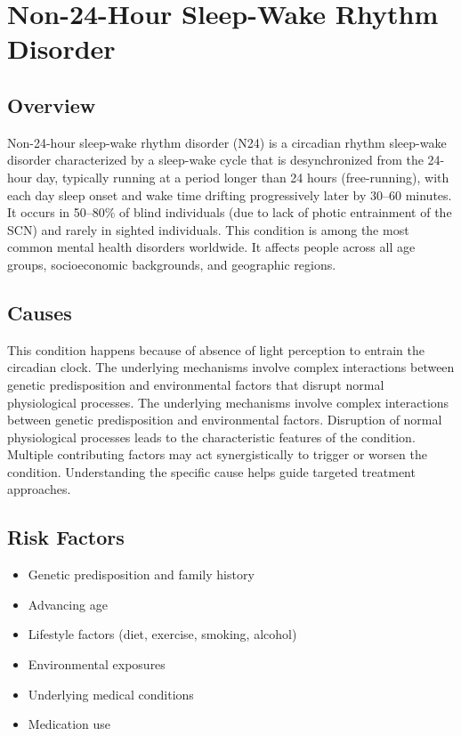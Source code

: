 \chapter{Non-24-Hour Sleep-Wake Rhythm Disorder}
\label{sec:Non-24-Hour Sleep-Wake Rhythm Disorder}

\section{Overview}
Non-24-hour sleep-wake rhythm disorder (N24) is a circadian rhythm sleep-wake disorder characterized by a sleep-wake cycle that is desynchronized from the 24-hour day, typically running at a period longer than 24 hours (free-running), with each day sleep onset and wake time drifting progressively later by 30--60 minutes. It occurs in 50--80\% of blind individuals (due to lack of photic entrainment of the SCN) and rarely in sighted individuals. This condition is among the most common mental health disorders worldwide. It affects people across all age groups, socioeconomic backgrounds, and geographic regions.
\section{Causes}
This condition happens because of absence of light perception to entrain the circadian clock. The underlying mechanisms involve complex interactions between genetic predisposition and environmental factors that disrupt normal physiological processes. The underlying mechanisms involve complex interactions between genetic predisposition and environmental factors. Disruption of normal physiological processes leads to the characteristic features of the condition. Multiple contributing factors may act synergistically to trigger or worsen the condition. Understanding the specific cause helps guide targeted treatment approaches.
\section{Risk Factors}


\begin{itemize}[noitemsep]
  \item Genetic predisposition and family history
  \item Advancing age
  \item Lifestyle factors (diet, exercise, smoking, alcohol)
  \item Environmental exposures
  \item Underlying medical conditions
  \item Medication use
\end{itemize}
